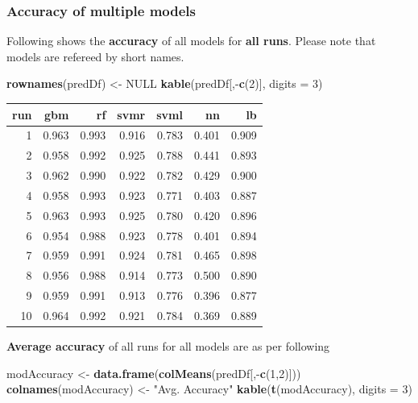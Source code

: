 \documentclass[]{article}
\newenvironment{Shaded}{\begin{snugshade}}{\end{snugshade}}
\newcommand{\KeywordTok}[1]{\textcolor[rgb]{0.13,0.29,0.53}{\textbf{{#1}}}}
\newcommand{\DataTypeTok}[1]{\textcolor[rgb]{0.13,0.29,0.53}{{#1}}}
\newcommand{\DecValTok}[1]{\textcolor[rgb]{0.00,0.00,0.81}{{#1}}}
\newcommand{\StringTok}[1]{\textcolor[rgb]{0.31,0.60,0.02}{{#1}}}
\newcommand{\OtherTok}[1]{\textcolor[rgb]{0.56,0.35,0.01}{{#1}}}
\newcommand{\NormalTok}[1]{{#1}}
\begin{document}
\subsubsection{Accuracy of multiple
models}\label{accuracy-of-multiple-models}

Following shows the \textbf{accuracy} of all models for \textbf{all
runs}. Please note that models are refereed by short names.

\begin{Shaded}
\begin{Highlighting}[]
\KeywordTok{rownames}\NormalTok{(predDf) <-}\StringTok{ }\OtherTok{NULL}
\KeywordTok{kable}\NormalTok{(predDf[,-}\KeywordTok{c}\NormalTok{(}\DecValTok{2}\NormalTok{)], }\DataTypeTok{digits =} \DecValTok{3}\NormalTok{)}
\end{Highlighting}
\end{Shaded}

\begin{longtable}[]{@{}rrrrrrr@{}}
\toprule
run & gbm & rf & svmr & svml & nn & lb\tabularnewline
\midrule
\endhead
1 & 0.963 & 0.993 & 0.916 & 0.783 & 0.401 & 0.909\tabularnewline
2 & 0.958 & 0.992 & 0.925 & 0.788 & 0.441 & 0.893\tabularnewline
3 & 0.962 & 0.990 & 0.922 & 0.782 & 0.429 & 0.900\tabularnewline
4 & 0.958 & 0.993 & 0.923 & 0.771 & 0.403 & 0.887\tabularnewline
5 & 0.963 & 0.993 & 0.925 & 0.780 & 0.420 & 0.896\tabularnewline
6 & 0.954 & 0.988 & 0.923 & 0.778 & 0.401 & 0.894\tabularnewline
7 & 0.959 & 0.991 & 0.924 & 0.781 & 0.465 & 0.898\tabularnewline
8 & 0.956 & 0.988 & 0.914 & 0.773 & 0.500 & 0.890\tabularnewline
9 & 0.959 & 0.991 & 0.913 & 0.776 & 0.396 & 0.877\tabularnewline
10 & 0.964 & 0.992 & 0.921 & 0.784 & 0.369 & 0.889\tabularnewline
\bottomrule
\end{longtable}

\textbf{Average accuracy} of all runs for all models are as per
following

\begin{Shaded}
\begin{Highlighting}[]
\NormalTok{modAccuracy <-}\StringTok{ }\KeywordTok{data.frame}\NormalTok{(}\KeywordTok{colMeans}\NormalTok{(predDf[,-}\KeywordTok{c}\NormalTok{(}\DecValTok{1}\NormalTok{,}\DecValTok{2}\NormalTok{)]))}
\KeywordTok{colnames}\NormalTok{(modAccuracy) <-}\StringTok{ "Avg. Accuracy"}
\KeywordTok{kable}\NormalTok{(}\KeywordTok{t}\NormalTok{(modAccuracy), }\DataTypeTok{digits =} \DecValTok{3}\NormalTok{)}
\end{Highlighting}
\end{Shaded}
\end{document}
